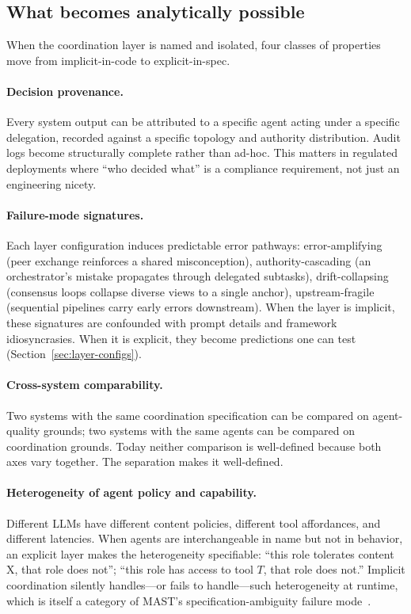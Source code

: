 \documentclass[11pt]{article}
\begin{document}
\subsection{What becomes analytically possible}
\label{sec:layer-explicit}

When the coordination layer is named and isolated, four classes of properties move from implicit-in-code to explicit-in-spec.

\paragraph{Decision provenance.}
Every system output can be attributed to a specific agent acting under a specific delegation, recorded against a specific topology and authority distribution. Audit logs become structurally complete rather than ad-hoc. This matters in regulated deployments where ``who decided what'' is a compliance requirement, not just an engineering nicety.

\paragraph{Failure-mode signatures.}
Each layer configuration induces predictable error pathways: error-amplifying (peer exchange reinforces a shared misconception), authority-cascading (an orchestrator's mistake propagates through delegated subtasks), drift-collapsing (consensus loops collapse diverse views to a single anchor), upstream-fragile (sequential pipelines carry early errors downstream). When the layer is implicit, these signatures are confounded with prompt details and framework idiosyncrasies. When it is explicit, they become predictions one can test (Section~\ref{sec:layer-configs}).

\paragraph{Cross-system comparability.}
Two systems with the same coordination specification can be compared on agent-quality grounds; two systems with the same agents can be compared on coordination grounds. Today neither comparison is well-defined because both axes vary together. The separation makes it well-defined.

\paragraph{Heterogeneity of agent policy and capability.}
Different LLMs have different content policies, different tool affordances, and different latencies. When agents are interchangeable in name but not in behavior, an explicit layer makes the heterogeneity specifiable: ``this role tolerates content X, that role does not''; ``this role has access to tool $T$, that role does not.'' Implicit coordination silently handles---or fails to handle---such heterogeneity at runtime, which is itself a category of MAST's specification-ambiguity failure mode~\citep{cemri2025mast}.
\end{document}
